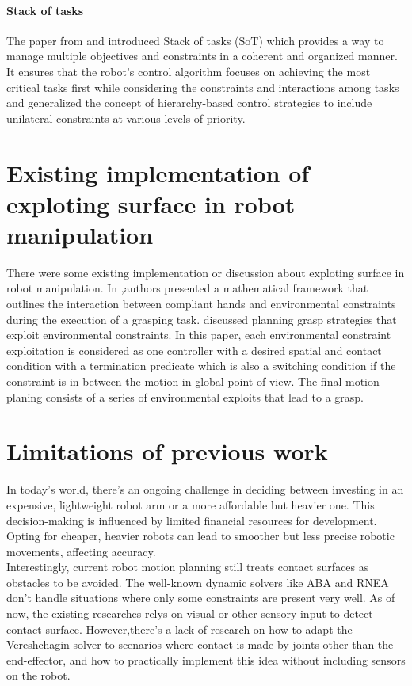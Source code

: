 \documentclass[report.tex]{subfiles}
\begin{document}
    \paragraph*{\large{Stack of tasks}\\}
    The paper from \cite{mansard2009unified} and \cite{mansard2009versatile} introduced Stack of tasks (SoT) which provides a way to manage multiple objectives and constraints in a coherent and organized manner. It ensures that the robot's control algorithm focuses on achieving the most critical tasks first while considering the constraints and interactions among tasks and generalized the concept of hierarchy-based control strategies to include unilateral constraints at various levels of priority.
    \section{Existing implementation of exploting surface in robot manipulation}\label{Existing implementation of exploting surface in robot manipulation}
    There were some existing implementation or discussion about exploting surface in robot manipulation. In \cite{salvietti2015modeling} ,authors presented a mathematical framework that outlines the interaction between compliant hands and environmental constraints during the execution of a grasping task. \cite{eppner2015planning} discussed planning grasp strategies that exploit environmental constraints. In this paper, each environmental constraint exploitation is considered as one controller with a desired spatial and contact condition with a termination predicate which is also a switching condition if the constraint is in between the motion in global point of view. The final motion planing consists of a series of environmental exploits that lead to a grasp.
    \section{Limitations of previous work}\label{Limitations of previous work}
    In today's world, there's an ongoing challenge in deciding between investing in an expensive, lightweight robot arm or a more affordable but heavier one. This decision-making is influenced by limited financial resources for development. Opting for cheaper, heavier robots can lead to smoother but less precise robotic movements, affecting accuracy.\\Interestingly, current robot motion planning still treats contact surfaces as obstacles to be avoided. The well-known dynamic solvers like ABA and RNEA don't handle situations where only some constraints are present very well. As of now, the existing researches relys on visual or other sensory input to detect contact surface. However,there's a lack of research on how to adapt the Vereshchagin solver to scenarios where contact is made by joints other than the end-effector, and how to practically implement this idea without including sensors on the robot.
\end{document}
